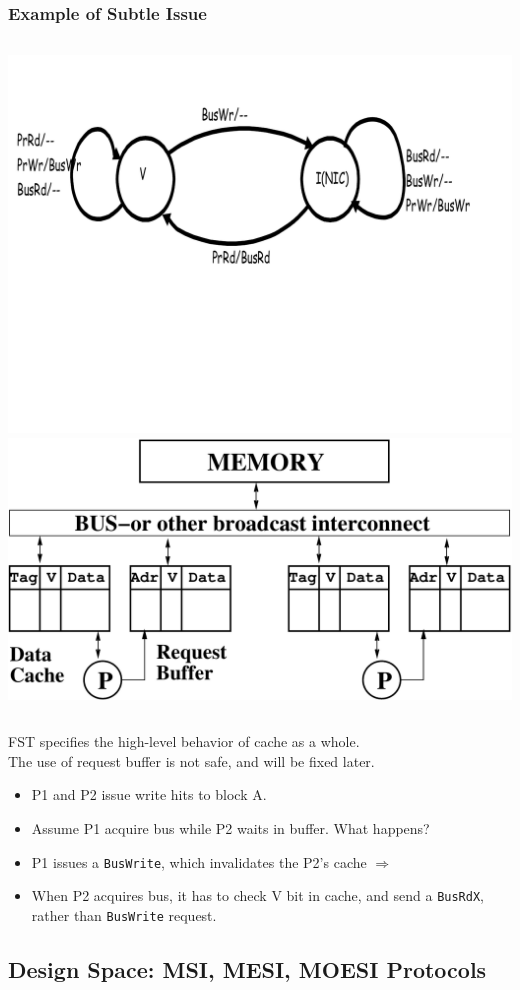 \documentclass{beamer}
\newcommand{\emp}[1]{\textcolor{DikuRed}{ #1}}
\begin{document}
\begin{frame}[fragile,t]
\frametitle{Example of Subtle Issue}

\begin{columns}
\includegraphics[width=35ex]{Figures/FigsInfCoherence/SimpleCohProt}
\includegraphics[width=30ex]{Figures/FigsInfCoherence/SMPreqbuff}
\end{columns}
\vspace{-3ex}
FST specifies the \emp{high-level} behavior of cache as a whole.\\
\emp{The use of request buffer is not safe, and will be fixed later.}
\begin{itemize}
    \item P1 and P2 issue \emp{write hits} to block A. 
    \item Assume P1 acquire bus while P2 waits in buffer. \alert{What happens?}\pause
    \item P1 issues a \emp{\tt BusWrite}, which invalidates the P2's cache $\Rightarrow$
    \item When P2 acquires bus, it has to check V bit in cache, and send a \emp{\tt BusRdX},
            rather than {\tt BusWrite} request.
\end{itemize}

\end{frame}


\subsection{Design Space: MSI, MESI, MOESI Protocols}
\end{document}
